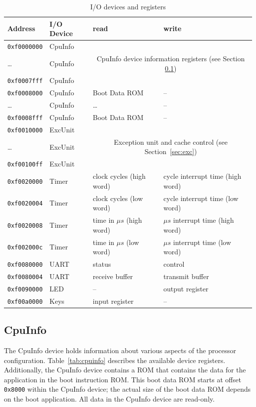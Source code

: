 \documentclass[a4paper,fontsize=10pt,twoside,DIV15,BCOR12mm,headinclude=true,footinclude=false,pagesize,bibtotoc]{scrbook}
\newcommand{\code}[1]{{\texttt{#1}}}
\begin{document}
\begin{table}
\centering
\begin{tabular}{llll}
\toprule
Address & I/O Device & read & write \\
\midrule
\code{0xf0000000} & CpuInfo & & \\
\dots             & CpuInfo & \multicolumn{2}{c}{CpuInfo device information registers (see Section \ref{sec:cpuinfo})} \\
\code{0xf0007fff} & CpuInfo & & \\
\code{0xf0008000} & CpuInfo & Boot Data ROM & -- \\
\dots             & CpuInfo & \dots    & -- \\
\code{0xf0008fff} & CpuInfo & Boot Data ROM & -- \\
\cmidrule{1-4}
\code{0xf0010000} & ExcUnit & &  \\
\dots             & ExcUnit & \multicolumn{2}{c}{Exception unit and cache control (see Section~\ref{sec:exc})} \\
\code{0xf00100ff} & ExcUnit & & \\
\cmidrule{1-4}
\code{0xf0020000} & Timer & clock cycles (high word) & cycle interrupt time (high word) \\
\code{0xf0020004} & Timer & clock cycles (low word) & cycle interrupt time (low word) \\
\code{0xf0020008} & Timer & time in $\mu s$ (high word) & $\mu s$ interrupt time (high word) \\
\code{0xf002000c} & Timer & time in $\mu s$ (low word) &  $\mu s$ interrupt time (low word) \\
\cmidrule{1-4}
\code{0xf0080000} & UART & status & control \\
\code{0xf0080004} & UART & receive buffer & transmit buffer \\
\cmidrule{1-4}
\code{0xf0090000} & LED & -- & output register \\
\cmidrule{1-4}
\code{0xf00a0000} & Keys & input register & -- \\
\bottomrule
\end{tabular}
\caption{I/O devices and registers}
\label{tab:iomap}
\end{table}

\subsection{CpuInfo}
\label{sec:cpuinfo}

The CpuInfo device holds information about various aspects of the
processor configuration. Table~\ref{tab:cpuinfo} describes the
available device registers. Additionally, the CpuInfo device contains
a ROM that contains the data for the application in the boot
instruction ROM. This boot data ROM starts at offset \code{0x8000}
within the CpuInfo device; the actual size of the boot data ROM
depends on the boot application. All data in the CpuInfo device are
read-only.
\end{document}
